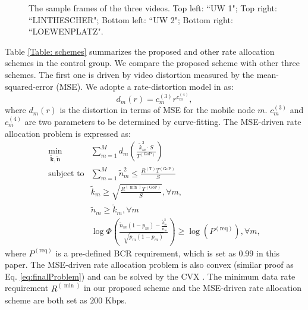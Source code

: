 \documentclass[journal]{IEEEtran}
\begin{document}
\begin{figure}[t]
\caption{The sample frames of the three videos. Top left: ``UW 1"; Top right: ``LINTHESCHER"; Bottom left: ``UW 2"; Bottom right: ``LOEWENPLATZ".}
\label{fig:sampleFrames}
\end{figure}

Table \ref{Table: schemes} summarizes the proposed and other rate allocation schemes in the control group. We compare the proposed scheme with other three schemes. The first one is driven by video distortion measured by the mean-squared-error (MSE). We adopte a rate-distortion model in \cite{HOSC10} as:
\begin{equation}
d_m\left(r\right)=c_m^{\left(3\right)}r^{c_m^{\left(4\right)}},
\end{equation}
where $d_m\left(r\right)$ is the distortion in terms of MSE for the mobile node $m$. $c_m^{\left(3\right)}$ and $c_m^{\left(4\right)}$ are two parameters to be determined by curve-fitting. The MSE-driven rate allocation problem is expressed as:
\begin{equation}
\begin{array}{rl}
\min_{\mathbf{\tilde{k}},\mathbf{\tilde{n}}} &\sum_{m=1}^{M}d_m\left(\frac{\tilde{k}^2_m \cdot S}{T^{\left(\text{GoP}\right)}}\right) \\
\text{subject to} & \sum\limits_{m=1}^{M}\tilde{n}^2_m\leq \frac{R^{\left(\text{T}\right)}T^{\left(\text{GoP}\right)}}{S}\\
& \tilde{k}_m \geq \sqrt{\frac{R^{\left(\min\right)}T^{\left(\text{GoP}\right)}}{S}}, \forall m, \\
& \tilde{n}_m \geq \tilde{k}_m, \forall m \\
& \log\Phi\left(\frac{\tilde{n}_m\left(1-p_m\right)-\frac{\tilde{k}_m^2}{\tilde{n}_m}}{\sqrt{p_m\left(1-p_m\right)}}\right) \geq \log(P^{\left(\text{req}\right)}), \forall m,
\end{array}
\end{equation}
where $P^{\left(\text{req}\right)}$ is a pre-defined BCR requirement, which is set as $0.99$ \cite{WSHZ13} in this paper. The MSE-driven rate allocation problem is also convex (similar proof as Eq. \eqref{eq:finalProblem}) and can be solved by the CVX \cite{CVX}. The minimum data rate requirement $R^{\left(\min\right)}$ in our proposed scheme and the MSE-driven rate allocation scheme are both set as $200$ Kbps.
\end{document}
